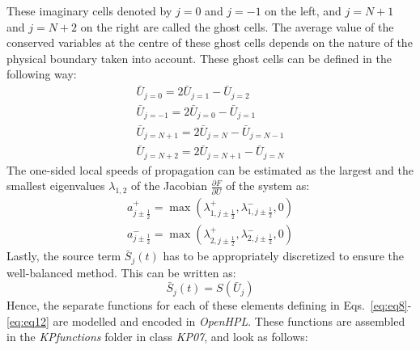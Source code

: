 \documentclass[%
]{USN-PhD}
\begin{document}
These imaginary cells denoted by $j=0$ and $j=-1$ on the left, and $j=N+1$ and $j=N+2$ on the right are called the ghost cells. The average value of the conserved variables at the centre of these ghost cells depends on the nature of the physical boundary taken into account. These ghost cells can be defined in the following way:
\begin{equation}\label{eq:eq11}
\begin{array}{c}
\bar{U}_{j=0}=2\bar{U}_{j=1}-\bar{U}_{j=2}\\
\bar{U}_{j=-1}=2\bar{U}_{j=0}-\bar{U}_{j=1}\\
\bar{U}_{j=N+1}=2\bar{U}_{j=N}-\bar{U}_{j=N-1}\\
\bar{U}_{j=N+2}=2\bar{U}_{j=N+1}-\bar{U}_{j=N}
\end{array}
\end{equation}
The one-sided local speeds of propagation can be estimated as the largest and the smallest eigenvalues $\lambda_{1,2}$ of the Jacobian $\frac{\partial F}{\partial U}$ of the system as:
\begin{equation}\label{eq:eq12}
\begin{array}{c}
a^+_{j\pm\frac{1}{2}}=\max\left(\lambda^+_{1,j\pm\frac{1}{2}},\lambda^-_{1,j\pm\frac{1}{2}},0\right)\\
a^-_{j\pm\frac{1}{2}}=\max\left(\lambda^+_{2,j\pm\frac{1}{2}},\lambda^-_{2,j\pm\frac{1}{2}},0\right)
\end{array}
\end{equation}
Lastly, the source term $\bar{S}_j\left(t\right)$ has to be appropriately discretized to ensure the well-balanced method. This can be written as:
\begin{equation}
\bar{S}_j\left(t\right)=S\left(\bar{U}_j\right)
\end{equation}
Hence, the separate functions for each of these elements defining in Eqs.~\ref{eq:eq8}-\ref{eq:eq12} are modelled and encoded in \emph{OpenHPL}. These functions are assembled in the \emph{KPfunctions} folder in class \emph{KP07}, and look as follows:
\end{document}
